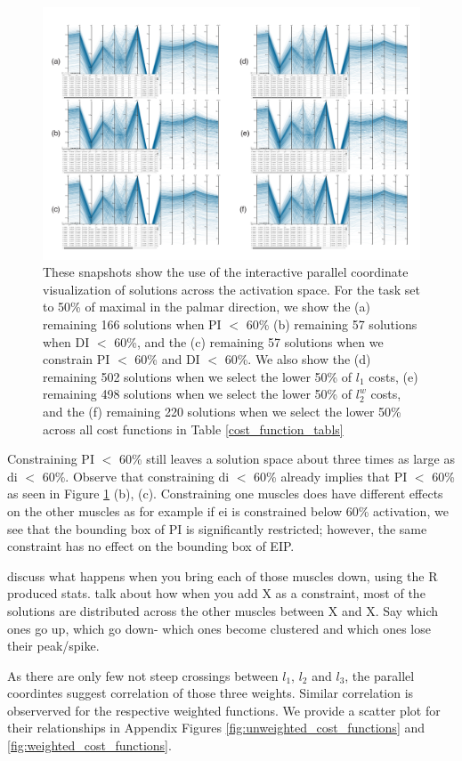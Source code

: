 \begin{figure}[htbp]
\centering
\includegraphics[width=\textwidth]{figs/parcoords.pdf}
\caption{These snapshots show the use of the interactive parallel coordinate visualization of solutions across the activation space. For the task set to 50\% of maximal in the palmar direction, we show the
(a) remaining 166 solutions when PI $<$ 60\% 
(b) remaining 57 solutions when DI $<$ 60\%, and the
(c) remaining 57 solutions when we constrain PI $<$ 60\% and DI $<$ 60\%. We also show the
(d) remaining 502 solutions when we select the lower 50\% of $l_1$ costs,
(e) remaining 498 solutions when we select the lower 50\% of $l_2^w$ costs, and the
(f) remaining 220 solutions when we select the lower 50\% across all cost functions in Table \ref{cost_function_tabls} }
\label{fig:parcoords}
\end{figure}

Constraining PI $<$ 60\% still leaves a solution space about three times as large as di $<$ 60\%. 
Observe that constraining di $<$ 60\% already implies that PI $<$ 60\% as seen in Figure \ref{fig:parcoords} (b), (c). 
Constraining one muscles does have different effects on the other muscles as for example if ei is constrained below 60\% activation, we see that the bounding box of PI is significantly restricted; however, the same constraint has no effect on the bounding box of EIP.

discuss what happens when you bring each of those muscles down, using the R produced stats.
talk about how when you add X as a constraint, most of the solutions are distributed across the other muscles between X and X. Say which ones go up, which go down- which ones become clustered and which ones lose their peak/spike.

As there are only few not steep crossings between $l_1$, $l_2$ and $l_3$, the parallel coordintes suggest correlation of those three weights. Similar correlation is observerved for the respective weighted functions. %
We provide a scatter plot for their relationships in Appendix Figures \ref{fig:unweighted_cost_functions} and \ref{fig:weighted_cost_functions}.


